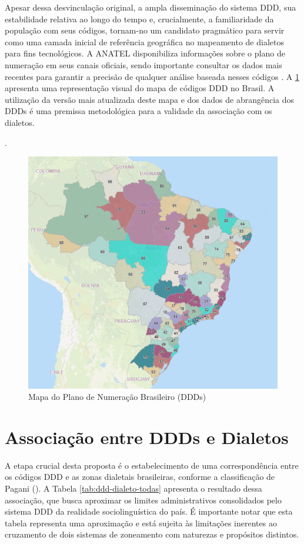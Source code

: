 Apesar dessa desvinculação original, a ampla disseminação do sistema DDD, sua estabilidade relativa ao longo do tempo e, crucialmente, a familiaridade da população com seus códigos, tornam-no um candidato pragmático para servir como uma camada inicial de referência geográfica no mapeamento de dialetos para fins tecnológicos. A ANATEL disponibiliza informações sobre o plano de numeração em seus canais oficiais, sendo importante consultar os dados mais recentes para garantir a precisão de qualquer análise baseada nesses códigos \cite{anatel_pnb}. A \ref{fig:mapa-ddd} apresenta uma representação visual do mapa de códigos DDD no Brasil. A utilização da versão mais atualizada deste mapa e dos dados de abrangência dos DDDs é uma premissa metodológica para a validade da associação com os dialetos.


\cite{anatel_pnb}.
\begin{figure}[ht]
  \centering
  \includegraphics[width=\linewidth]{images/mapa_ddd_brasil.png}
  \caption{Mapa do Plano de Numeração Brasileiro (DDDs)}
  \label{fig:mapa-ddd}
\end{figure}

\section{Associação entre DDDs e Dialetos}


A etapa crucial desta proposta é o estabelecimento de uma correspondência entre os códigos DDD e as zonas dialetais brasileiras, conforme a classificação de Pagani (\citeyear{pagani2022}). A Tabela \ref{tab:ddd-dialeto-todas} apresenta o resultado dessa associação, que busca aproximar os limites administrativos consolidados pelo sistema DDD da realidade sociolinguística do país. É importante notar que esta tabela representa uma aproximação e está sujeita às limitações inerentes ao cruzamento de dois sistemas de zoneamento com naturezas e propósitos distintos.

